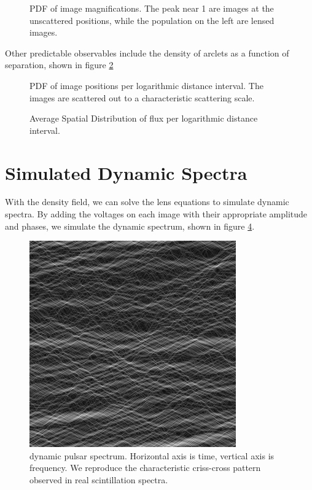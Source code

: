 \documentclass[useAMS,usenatbib]{mn2e}
\begin{document}
\begin{figure}
\centerline{}
\caption{PDF of image magnifications.  The peak near 1 are images at
  the unscattered positions, while the population on the left are
  lensed images.
}
\label{fig:mhist}
\end{figure}

Other predictable observables include the density of arclets as a
function of separation, shown in figure \ref{fig:pos}

\begin{figure}
\centerline{}
\caption{PDF of image positions per logarithmic distance interval.  The images are scattered out to a
  characteristic scattering scale.
}
\label{fig:pos}
\end{figure}
\begin{figure}
\centerline{}
\caption{Average Spatial Distribution of flux per logarithmic distance
  interval.  
}
\label{fig:posmag}
\end{figure}

\section{Simulated Dynamic Spectra}

With the density field, we can solve the lens equations to simulate
dynamic spectra.  By adding the voltages on each image  with their
appropriate amplitude and phases, we simulate the dynamic spectrum,
shown in figure \ref{fig:ds}.

\begin{figure}
\centerline{\includegraphics[width=3.5in]{rspect.jpg}}
\caption{dynamic pulsar spectrum.  Horizontal axis is time, vertical
  axis is frequency.  We reproduce the characteristic criss-cross
  pattern observed in real scintillation spectra.}
\label{fig:ds}
\end{figure}
\end{document}
